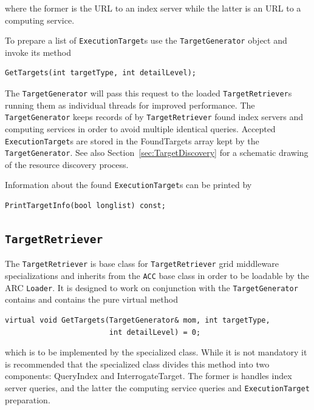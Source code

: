 \documentclass{book}
\newcommand{\TargetGenerator}{\texttt{TargetGenerator}}
\newcommand{\TargetRetriever}{\texttt{TargetRetriever}}
\newcommand{\ExecutionTarget}{\texttt{ExecutionTarget}}
\begin{document}
where the former is the URL to an index server while the latter is an URL to a computing service.

To prepare a list of {\ExecutionTarget}s use the {\TargetGenerator} object and invoke its method

\begin{shaded}
\begin{verbatim}
GetTargets(int targetType, int detailLevel);
\end{verbatim}
\end{shaded}

The {\TargetGenerator} will pass this request to the loaded {\TargetRetriever}s running them as individual threads 
for improved performance. The {\TargetGenerator} keeps records of by {\TargetRetriever} found index servers and computing 
services in order to avoid multiple identical queries. Accepted {\ExecutionTarget}s are stored in the FoundTargets 
array kept by the {\TargetGenerator}. See also Section~\ref{sec:TargetDiscovery} for a schematic drawing of the 
resource discovery process.

Information about the found {\ExecutionTarget}s can be printed by 

\begin{shaded}
\begin{verbatim}
PrintTargetInfo(bool longlist) const;
\end{verbatim}
\end{shaded}

\subsection{{\TargetRetriever}} The {\TargetRetriever} is base class for {\TargetRetriever} grid middleware specializations and 
inherits from the \texttt{ACC} base class in order to be loadable by the ARC \texttt{Loader}. It is designed to work on conjunction 
with the {\TargetGenerator} contains and contains the pure virtual method

\begin{shaded}
\begin{verbatim}
virtual void GetTargets(TargetGenerator& mom, int targetType,
                        int detailLevel) = 0;
\end{verbatim}
\end{shaded}

which is to be implemented by the specialized class. While it is not mandatory it is recommended that the specialized class 
divides this method into two components: QueryIndex and InterrogateTarget. The former is handles index server queries, and the 
latter the computing service queries and {\ExecutionTarget} preparation. 
\end{document}
